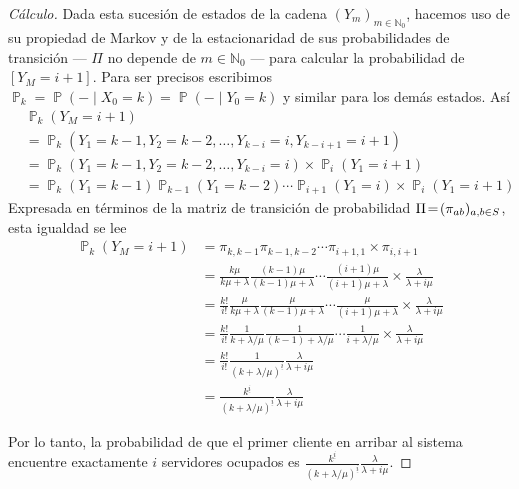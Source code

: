 \documentclass{article}
\DeclareMathOperator{\prob}{\mathbb{P}}
\newcommand{\placeholderParameter}{-}
\newcommand{\naturalnum}{\mathbb{N}}
\theoremstyle{definition}
\begin{document}
\begin{proof}[Cálculo]
Dada esta sucesión de estados de la cadena \((Y_m)_{m \in \naturalnum_0}\), hacemos uso de su propiedad de Markov y de la estacionaridad de sus probabilidades de transición --- \(\Pi\) no depende de \(m \in \naturalnum_0\) --- para calcular la probabilidad de \([Y_M = i + 1]\).
Para ser precisos escribimos \(\prob_k = \prob(\placeholderParameter \mid X_0 = k) = \prob(\placeholderParameter \mid Y_0 = k)\) y similar para los demás estados.
Así
\begin{align}
	&\prob_k(Y_M = i + 1) 
	\\
	&=
		\prob_k(Y_1 = k - 1, Y_2 = k - 2, \dots, Y_{k - i} = i, Y_{k - i + 1} = i + 1)
	\\
	&=
		\prob_k(Y_1 = k - 1, Y_2 = k - 2, \dots, Y_{k - i} = i) \times \prob_i(Y_1 = i + 1)
	\\
	&=
		\prob_k(Y_1 = k - 1) \prob_{k - 1}(Y_1 = k - 2) \cdots \prob_{i + 1}(Y_1 = i) \times \prob_i(Y_1 = i + 1)
\end{align}
Expresada en términos de la matriz de transición de probabilidad \(\Pi \! = \! (\pi_{a b})_{a,b \in S}\), esta igualdad se lee
\begin{align}
	\prob_k(Y_M = i + 1)
	&=
		\pi_{k, k - 1} \pi_{k - 1, k - 2} \cdots \pi_{i + 1, 1} \times \pi_{i, i + 1}
		\\
	&= 
		\frac{k \mu}{k \mu + \lambda} \frac{(k - 1) \mu}{(k - 1) \mu + \lambda} \cdots \frac{(i + 1) \mu}{(i + 1) \mu + \lambda} \times \frac{\lambda}{\lambda + i \mu}
	\\
	&= 
		\frac{k!}{i!} \frac{ \mu}{k \mu + \lambda} \frac{\mu}{(k - 1) \mu + \lambda} \cdots \frac{\mu}{(i + 1) \mu + \lambda} \times \frac{\lambda}{\lambda + i \mu}
	\\
	&= 
		\frac{k!}{i!} \frac{1}{k + \lambda / \mu} \frac{1}{(k - 1) + \lambda / \mu} \cdots \frac{1}{i + \lambda / \mu} \times \frac{\lambda}{\lambda + i \mu}
	\\
	&= 
		\frac{k!}{i!} \frac{1}{(k + \lambda / \mu)^{\underline{i}}} \frac{\lambda}{\lambda + i \mu}
	\\
	&= 
		\frac{k^{\underline{i}}}{(k + \lambda / \mu)^{\underline{i}}} \frac{\lambda}{\lambda + i \mu}
\end{align}

Por lo tanto, la probabilidad de que el primer cliente en arribar al sistema encuentre exactamente \(i\) servidores ocupados es \(\displaystyle \frac{k^{\underline{i}}}{(k + \lambda / \mu)^{\underline{i}}} \frac{\lambda}{\lambda + i \mu}\).
\end{proof}
\end{document}
